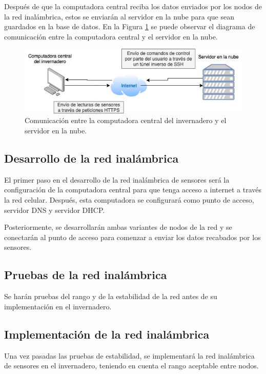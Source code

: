 Después de que la computadora central reciba los datos enviados por los nodos de la red inalámbrica, estos se enviarán al servidor en la nube para que sean guardados en la base de datos. En la Figura \ref{fig:coms_vps_raspberry} se puede observar el diagrama de comunicación entre la computadora central y el servidor en la nube.

\begin{figure}[!ht]
	\centering
	\includegraphics[width=.85\linewidth]{imagenes/diagramas/comunicacion_vps_raspberry.png}
	\caption{Comunicación entre la computadora central del invernadero y el servidor en la nube.}
	\label{fig:coms_vps_raspberry}
\end{figure}


\subsection{Desarrollo de la red inalámbrica}
El primer paso en el desarrollo de la red inalámbrica de sensores será la configuración de la computadora central para que tenga acceso a internet a través la red celular. Después, esta computadora se configurará como punto de acceso, servidor DNS y servidor DHCP.

Posteriormente, se desarrollarán ambas variantes de nodos de la red y se conectarán al punto de acceso para comenzar a enviar los datos recabados por los sensores.
 
\subsection{Pruebas de la red inalámbrica}
Se harán pruebas del rango y de la estabilidad de la red antes de su implementación en el invernadero. 

\subsection{Implementación de la red inalámbrica}
Una vez pasadas las pruebas de estabilidad, se implementará la red inalámbrica de sensores en el invernadero, teniendo en cuenta el rango aceptable entre nodos. %

